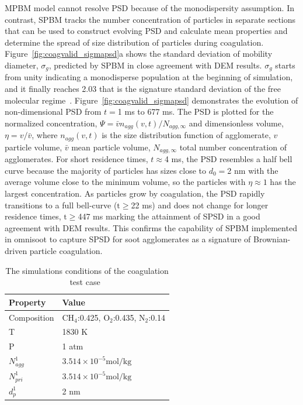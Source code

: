 MPBM model cannot resolve PSD because of the monodispersity assumption. In contrast, SPBM tracks the number concentration of particles in separate sections that can be used to construct evolving PSD and calculate mean properties and determine the spread of size distribution of particles during coagulation. Figure~\ref{fig:coagvalid_sigmapsd}a shows the standard deviation of mobility diameter, ${\sigma_g}$, predicted by SPBM in close agreement with DEM results. ${\sigma_g}$ starts from unity indicating a monodisperse population at the beginning of simulation, and it finally reaches 2.03 that is the signature standard deviation of the free molecular regime~\citep{vemury1995self}. Figure~\ref{fig:coagvalid_sigmapsd} demonstrates the evolution of non-dimensional PSD from $t=$1 ms to 677 ms. The PSD is plotted for the normalized concentration, ${\Psi= \bar{v}n_{agg}(v,t)/N_{agg,\infty}}$ and dimensionless volume, ${\eta= v/ \bar{v}}$, where ${n_{agg}(v,t)}$ is the size distribution function of agglomerate, ${v}$ particle volume, ${\bar{v}}$ mean particle volume, ${N_{agg,\infty}}$ total number concentration of agglomerates. For short residence times, $t\approx$4 ms, the PSD resembles a half bell curve because the majority of particles has sizes close to ${d_0=}$2 nm with the average volume close to the minimum volume, so the particles with ${\eta\approx1}$ has the largest concentration. As particles grow by coagulation, the PSD rapidly transitions to a full bell-curve ($\mathrm{t\ge}$22 ms) and does not change for longer residence times, $\mathrm{t\ge}$447 ms marking the attainment of SPSD in a good agreement with DEM results. This confirms the capability of SPBM implemented in omnisoot to capture SPSD for soot agglomerates as a signature of Brownian-driven particle coagulation.  

\begin{table}
	\caption{The simulations conditions of the coagulation test case~\citep{kholghy2021surface}}
	\label{tab:simcond_coagtest}
	\centering
	\begin{tabular}{l l}
		\hline
		\textbf{Property} & \textbf{Value} \\
		\hline
		Composition & $\mathrm{CH_4}$:0.425, $\mathrm{O_2}$:0.435, $\mathrm{N_2}$:0.14\\
		T & 1830 K\\
		P & 1 atm \\
		${N^1_{agg}}$ & $3.514\times10^{-5} \mathrm{mol/kg}$ \\ 
		${N^1_{pri}}$ & $3.514\times10^{-5} \mathrm{mol/kg}$\\
		${d^1_{p}}$ & 2 nm \\
		\hline
	\end{tabular}
\end{table}


